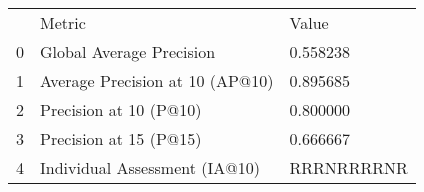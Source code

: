 \begin{tabular}{lll}
 & Metric & Value \\
0 & Global Average Precision & 0.558238 \\
1 & Average Precision at 10 (AP@10) & 0.895685 \\
2 & Precision at 10 (P@10) & 0.800000 \\
3 & Precision at 15 (P@15) & 0.666667 \\
4 & Individual Assessment (IA@10) & RRRNRRRRNR \\
\end{tabular}
